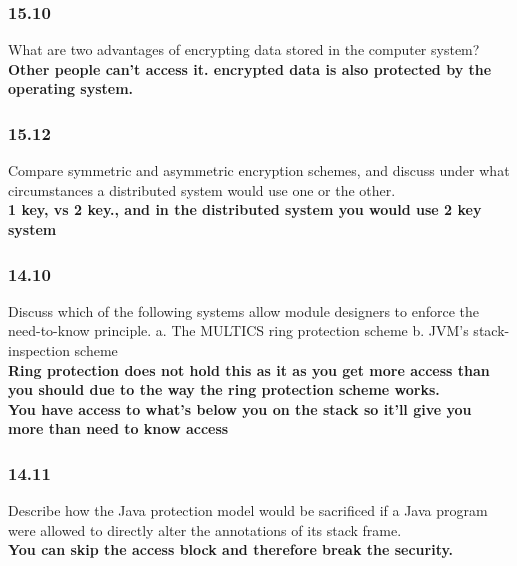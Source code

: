 \documentclass[a4paper,10pt,titlepage]{report}
\begin{document}
\subsubsection{15.10} What are two advantages of encrypting data stored in the computer system?
\\ \hspace{10mm} \textbf{Other people can't access it. encrypted data is also protected by the operating system.} \\



\subsubsection{15.12} Compare symmetric and asymmetric encryption schemes, and discuss under what circumstances a distributed system would use one or the other.
\\ \hspace{10mm} \textbf{1 key, vs 2 key., and in the distributed system you would use 2 key system} \\




\subsubsection{14.10} Discuss which of the following systems allow module designers to enforce the need-to-know principle. a. The MULTICS ring protection scheme b. JVM's stack-inspection scheme
\\ \hspace{10mm} \textbf{Ring protection does not hold this as it as you get more access than you should due to the way the ring protection scheme works.} \\
   \hspace{10mm} \textbf{You have access to what's below you on the stack so it'll give you more than need to know access} \\


\subsubsection{14.11} Describe how the Java protection model would be sacrificed if a Java program were allowed to directly alter the annotations of its stack frame.
\\ \hspace{10mm} \textbf{You can skip the access block and therefore break the security.} \\
\end{document}
